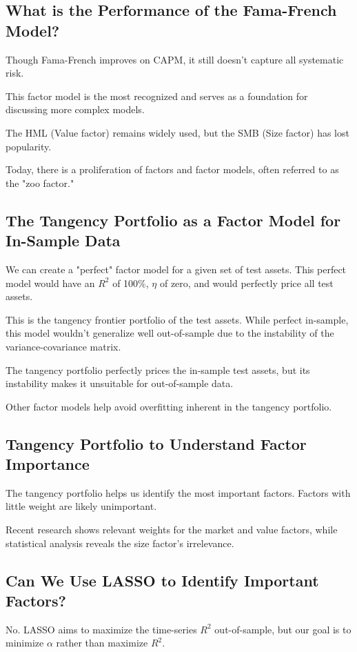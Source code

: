 \documentclass{article}
\begin{document}
\subsection{What is the Performance of the Fama-French Model?}
Though Fama-French improves on CAPM, it still doesn’t capture all systematic risk.

This factor model is the most recognized and serves as a foundation for discussing more complex models.

The HML (Value factor) remains widely used, but the SMB (Size factor) has lost popularity.

Today, there is a proliferation of factors and factor models, often referred to as the "zoo factor."

\subsection{The Tangency Portfolio as a Factor Model for In-Sample Data}
We can create a "perfect" factor model for a given set of test assets. This perfect model would have an $R^2$ of 100\%, $\eta$ of zero, and would perfectly price all test assets.

This is the tangency frontier portfolio of the test assets. While perfect in-sample, this model wouldn’t generalize well out-of-sample due to the instability of the variance-covariance matrix.

The tangency portfolio perfectly prices the in-sample test assets, but its instability makes it unsuitable for out-of-sample data.

Other factor models help avoid overfitting inherent in the tangency portfolio.

\subsection{Tangency Portfolio to Understand Factor Importance}
The tangency portfolio helps us identify the most important factors. Factors with little weight are likely unimportant.

Recent research shows relevant weights for the market and value factors, while statistical analysis reveals the size factor's irrelevance.

\subsection{Can We Use LASSO to Identify Important Factors?}
No. LASSO aims to maximize the time-series $R^2$ out-of-sample, but our goal is to minimize $\alpha$ rather than maximize $R^2$.
\end{document}
